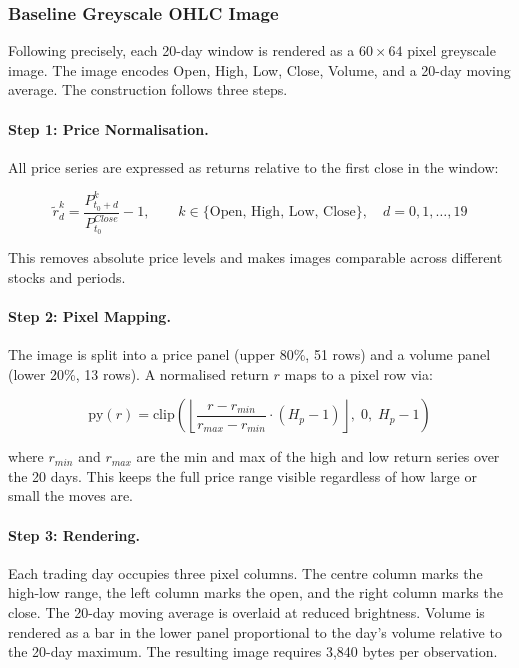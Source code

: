 \subsubsection{Baseline Greyscale OHLC Image}

Following \textcite{Jiang2023} precisely, each 20-day window is rendered as a $60 \times 64$ pixel greyscale image. The image encodes Open, High, Low, Close, Volume, and a 20-day moving average. The construction follows three steps.

\paragraph{Step 1: Price Normalisation.}
All price series are expressed as returns relative to the first close in the window:

\begin{equation}
\tilde{r}_{d}^{k} = \frac{P_{t_0 + d}^{k}}{P_{t_0}^{Close}} - 1, \qquad k \in \{\text{Open, High, Low, Close}\}, \quad d = 0, 1, \ldots, 19
\label{eq:price_norm}
\end{equation}

This removes absolute price levels and makes images comparable across different stocks and periods.

\paragraph{Step 2: Pixel Mapping.}
The image is split into a price panel (upper 80\%, 51 rows) and a volume panel (lower 20\%, 13 rows). A normalised return $r$ maps to a pixel row via:

\begin{equation}
\text{py}(r) = \text{clip}\!\left(\left\lfloor\frac{r - r_{min}}{r_{max} - r_{min}} \cdot (H_p - 1)\right\rfloor,\; 0,\; H_p - 1\right)
\label{eq:pixmap}
\end{equation}

where $r_{min}$ and $r_{max}$ are the min and max of the high and low return series over the 20 days. This keeps the full price range visible regardless of how large or small the moves are.

\paragraph{Step 3: Rendering.}
Each trading day occupies three pixel columns. The centre column marks the high-low range, the left column marks the open, and the right column marks the close. The 20-day moving average is overlaid at reduced brightness. Volume is rendered as a bar in the lower panel proportional to the day's volume relative to the 20-day maximum. The resulting image requires 3,840 bytes per observation.


